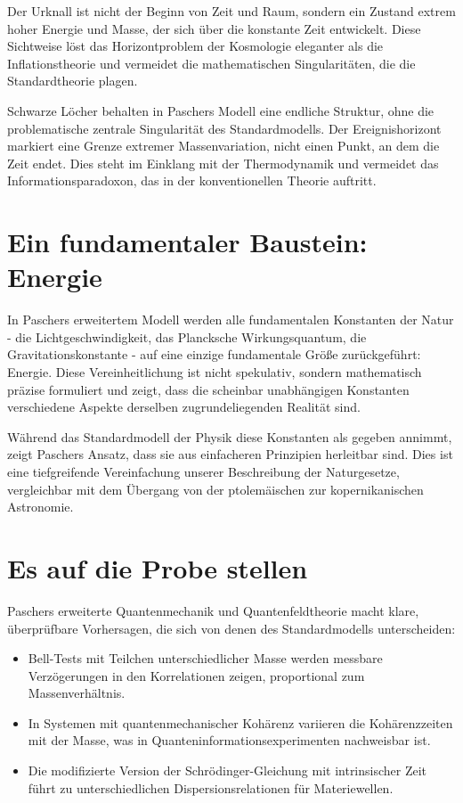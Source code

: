 \documentclass[a4paper,12pt]{article}
\begin{document}
	Der Urknall ist nicht der Beginn von Zeit und Raum, sondern ein Zustand extrem hoher Energie und Masse, der sich über die konstante Zeit entwickelt. Diese Sichtweise löst das Horizontproblem der Kosmologie eleganter als die Inflationstheorie und vermeidet die mathematischen Singularitäten, die die Standardtheorie plagen.
	
	Schwarze Löcher behalten in Paschers Modell eine endliche Struktur, ohne die problematische zentrale Singularität des Standardmodells. Der Ereignishorizont markiert eine Grenze extremer Massenvariation, nicht einen Punkt, an dem die Zeit endet. Dies steht im Einklang mit der Thermodynamik und vermeidet das Informationsparadoxon, das in der konventionellen Theorie auftritt.
	
	\section{Ein fundamentaler Baustein: Energie}
	In Paschers erweitertem Modell werden alle fundamentalen Konstanten der Natur - die Lichtgeschwindigkeit, das Plancksche Wirkungsquantum, die Gravitationskonstante - auf eine einzige fundamentale Größe zurückgeführt: Energie. Diese Vereinheitlichung ist nicht spekulativ, sondern mathematisch präzise formuliert und zeigt, dass die scheinbar unabhängigen Konstanten verschiedene Aspekte derselben zugrundeliegenden Realität sind.
	
	Während das Standardmodell der Physik diese Konstanten als gegeben annimmt, zeigt Paschers Ansatz, dass sie aus einfacheren Prinzipien herleitbar sind. Dies ist eine tiefgreifende Vereinfachung unserer Beschreibung der Naturgesetze, vergleichbar mit dem Übergang von der ptolemäischen zur kopernikanischen Astronomie.

	
	\section{Es auf die Probe stellen}
	Paschers erweiterte Quantenmechanik und Quantenfeldtheorie macht klare, überprüfbare Vorhersagen, die sich von denen des Standardmodells unterscheiden:
	
	\begin{itemize}
		\item Bell-Tests mit Teilchen unterschiedlicher Masse werden messbare Verzögerungen in den Korrelationen zeigen, proportional zum Massenverhältnis.
		\item In Systemen mit quantenmechanischer Kohärenz variieren die Kohärenzzeiten mit der Masse, was in Quanteninformationsexperimenten nachweisbar ist.
		\item Die modifizierte Version der Schrödinger-Gleichung mit intrinsischer Zeit führt zu unterschiedlichen Dispersionsrelationen für Materiewellen.
	\end{itemize}
	
\end{document}
